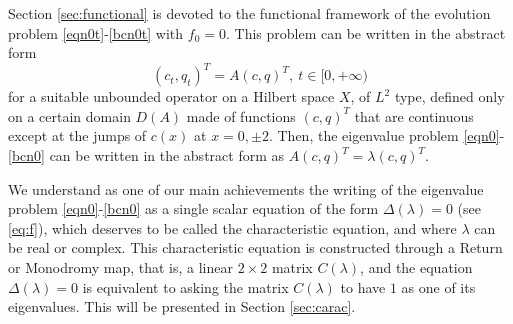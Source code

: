 \documentclass[a4paper]{article}
\numberwithin{equation}{section}
\begin{document}
Section \ref{sec:functional} is devoted to the functional framework of the evolution problem \eqref{eqn0t}-\eqref{bcn0t} with $f_0=0$. This problem can be written in the abstract form
\begin{equation}\label{abs}
(c_t,q_t)^T = A(c,q)^T ,\ t\in[0,+\infty)
\end{equation}
for a suitable unbounded operator on a Hilbert space $X$, of $L^2$ type, defined only on a certain domain $D(A)$ made of functions $(c,q)^T$ that are continuous except at the jumps of $c(x)$ at $x=0,\pm2$. Then, the eigenvalue problem \eqref{eqn0}-\eqref{bcn0} can be written in the abstract form as $A(c,q)^T=\lambda (c,q)^T$.

We understand as one of our main achievements the writing of the eigenvalue problem  \eqref{eqn0}-\eqref{bcn0} as a single scalar equation of the form $\Delta(\lambda)=0$ (see \eqref{eq:f}), which deserves to be called the characteristic equation, and where $\lambda$ can be real or complex. This characteristic equation is constructed through a Return or Monodromy map, that is, a linear $2\times 2$ matrix $C(\lambda)$, and the equation $\Delta(\lambda)=0$ is equivalent to asking the matrix $C(\lambda)$ to have $1$ as one of its eigenvalues. This will be presented in Section \ref{sec:carac}.
\end{document}
